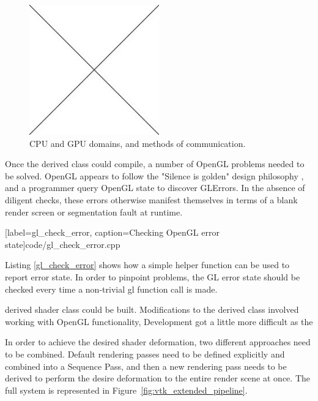 \documentclass[MSc,paper=a4,pagesize=auto]{icldt}
\begin{document}
\begin{figure}[htbp!]
    \centering
    \includegraphics[width=0.5\textwidth]{resources/placeholder}
    \caption{CPU and GPU domains, and methods of communication.}
    \label{fig:cpu_gpu_domains}
\end{figure}

Once the derived class could compile, a number of OpenGL problems needed to be solved. OpenGL appears to follow the "Silence is golden" design philosophy \cite{the_art_of_unix_programming}, and a programmer query OpenGL state to discover GLErrors. In the absence of diligent checks, these errors otherwise manifest themselves in terms of a blank render screen or segmentation fault at runtime. 


  [label=gl_check_error, caption=Checking OpenGL error state]{code/gl_check_error.cpp}

Listing \ref{gl_check_error} shows how a simple helper function can be used to report error state. In order to pinpoint problems, the GL error state should be checked every time a non-trivial gl function call is made.





derived shader class could be built. Modifications to the derived class involved working with OpenGL functionality,  Development got a little more difficult as the 




In order to achieve the desired shader deformation, two different approaches need to be combined. Default rendering passes need to be defined explicitly and combined into a Sequence Pass, and then a new rendering pass needs to be derived to perform the desire deformation to the entire render scene at once. The full system is represented in Figure~\ref{fig:vtk_extended_pipeline}.
\end{document}
